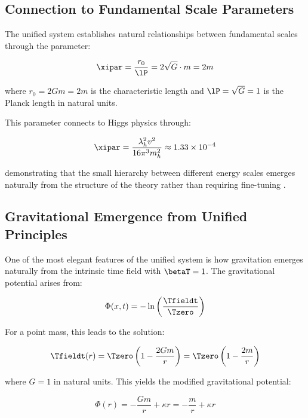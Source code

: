 	\subsection{Connection to Fundamental Scale Parameters}
	\label{subsec:fundamental_scales}
	
	The unified system establishes natural relationships between fundamental scales through the parameter:
	
	\begin{equation}
		\xipar = \frac{r_0}{\lP} = 2\sqrt{G} \cdot m = 2m
	\end{equation}
	
	where $r_0 = 2Gm = 2m$ is the characteristic length and $\lP = \sqrt{G} = 1$ is the Planck length in natural units.
	
	This parameter connects to Higgs physics through:
	
	\begin{equation}
		\xipar = \frac{\lambda_h^2 v^2}{16\pi^3 m_h^2} \approx 1.33 \times 10^{-4}
	\end{equation}
	
	demonstrating that the small hierarchy between different energy scales emerges naturally from the structure of the theory rather than requiring fine-tuning \cite{pascher_beta_derivation_2025}.
	
	\subsection{Gravitational Emergence from Unified Principles}
	\label{subsec:gravitational_emergence_unified}
	
	One of the most elegant features of the unified system is how gravitation emerges naturally from the intrinsic time field with $\betaT = 1$. The gravitational potential arises from:
	
	\begin{equation}
		\Phi(x,t) = -\ln\left(\frac{\Tfieldt}{\Tzero}\right)
	\end{equation}
	
	For a point mass, this leads to the solution:
	
	\begin{equation}
		\Tfieldt(r) = \Tzero\left(1 - \frac{2Gm}{r}\right) = \Tzero\left(1 - \frac{2m}{r}\right)
	\end{equation}
	
	where $G = 1$ in natural units. This yields the modified gravitational potential:
	
	\begin{equation}
		\Phi(r) = -\frac{Gm}{r} + \kappa r = -\frac{m}{r} + \kappa r
	\end{equation}
	
